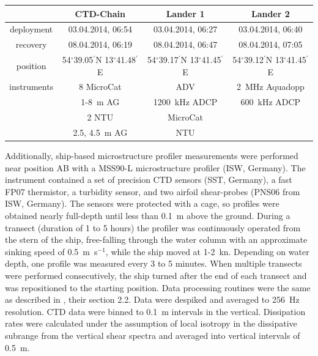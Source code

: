 \begin{table}
\begin{center}
\begin{tabular}{cccc}
& CTD-Chain & Lander 1 & Lander 2 \\
\hline
 deployment & 03.04.2014, 06:54 & 03.04.2014, 06:27 & 03.04.2014, 06:40 \\ 
 recovery & 08.04.2014, 06:19 & 08.04.2014, 06:47 & 08.04.2014, 07:05 \\
\hline
position & 54$^\circ$39.05$^\prime$N 13$^\circ$41.48$^\prime$E & 
54$^\circ$39.17$^\prime$N 13$^\circ$41.45$^\prime$E & 54$^\circ$39.12$^\prime$N 
13$^\circ$41.45$^\prime$E \\
\hline
instruments & 8 MicroCat & ADV & 2~MHz Aquadopp \\
 & 1-8~m AG & 1200~kHz ADCP & 600~kHz ADCP\\
 & 2 NTU & MicroCat & \\
 & 2.5, 4.5~m AG & NTU & \\
 \end{tabular}
\end{center}
\end{table}

Additionally, ship-based microstructure profiler measurements were performed 
near position AB with a MSS90-L microstructure profiler (ISW, Germany). The 
instrument contained a set of 
precision CTD sensors (SST, Germany), a fast FP07 thermistor, a turbidity 
sensor, and two airfoil shear-probes (PNS06 from ISW, Germany). The 
sensors were protected with a cage, so profiles were obtained nearly full-depth 
until less than 0.1~m above the ground. During a transect (duration of 1 to 5 
hours) the profiler was continuously operated from the stern of the ship, 
free-falling through the water column with an approximate sinking speed of 
0.5~m~s$^{-1}$, while the ship moved at 1-2~kn. Depending on water depth, one 
profile was measured every 3 to 5 minutes. When multiple transects 
were performed consecutively, the ship turned after the end of each transect 
and was repositioned to the starting position. 
Data processing routines were the same as described in \cite{vanderlee2011}, 
their section 2.2. Data were despiked and averaged to 256~Hz resolution. 
CTD data were binned to 0.1~m intervals in the vertical. Dissipation rates were 
calculated under the assumption of local isotropy in the dissipative subrange 
from the vertical shear spectra and averaged into vertical intervals of 0.5~m.


